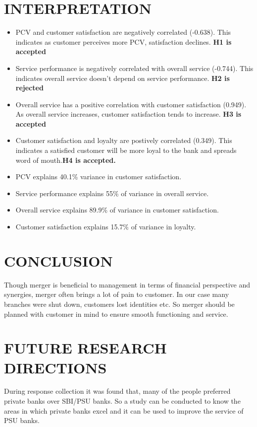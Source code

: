 \documentclass[a4paper, 14pt]{article}
\begin{document}
{\section*{INTERPRETATION}
\begin{itemize}
\item PCV and customer satisfaction are negatively correlated (-0.638). This indicates as customer perceives more PCV, satisfaction declines. \textbf{H1 is accepted}
\item Service performance is negatively correlated with overall service (-0.744). This indicates overall service doesn't depend on service performance. \textbf{H2 is rejected}
\item Overall service has a positive correlation with customer satisfaction (0.949). As overall service increases, customer satisfaction tends to increase. 
\textbf{H3 is accepted}
\item Customer satisfaction and loyalty are postively correlated (0.349). This indicates a satisfied customer will be more loyal to the bank and spreads word of mouth.\textbf{H4 is accepted.}
\item PCV explains 40.1\% variance in customer satisfaction.
\item Service performance explains 55\% of variance in overall service.
\item Overall service explains 89.9\% of variance in customer satisfaction.
\item Customer satisfaction explains 15.7\% of variance in loyalty.
\end{itemize}
\section*{CONCLUSION}
\par Though merger is beneficial to management in terms of financial perspective and synergies, merger often brings a lot of pain to customer. In our case many branches were shut down, customers lost identities etc. So merger should be planned with customer in mind to ensure smooth functioning and service.
\section*{FUTURE RESEARCH DIRECTIONS}
\par During response collection it was found that, many of the people preferred private banks over SBI/PSU banks. So a study can be conducted to know the areas in which private banks excel and it can be used to improve the service of PSU banks.
}
\end{document}
